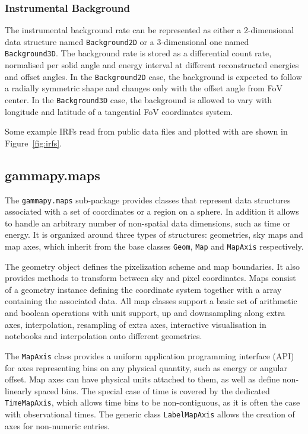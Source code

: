 \documentclass[longauth]{aa}
\newcommand{\code}[1]{\texttt{#1}}
\begin{document}
\subsubsection{Instrumental Background}
The instrumental background rate can be represented as either a 2-dimensional
data structure named \code{Background2D} or a 3-dimensional one named \code{Background3D}.
The background rate is stored as a differential count rate, normalised per solid angle
and energy interval at different reconstructed energies and offset angles.
In the \code{Background2D} case, the background is expected to follow a radially symmetric shape
and changes only with the offset angle from FoV center.
In the \code{Background3D} case, the background is allowed to vary with 
longitude and latitude of a tangential FoV coordinates system.

Some example IRFs read from public data files and plotted with \gammapy are shown 
in Figure~\ref{fig:irfs}.

\subsection{gammapy.maps}
\label{ssec:gammapy-maps}
The \code{gammapy.maps} sub-package provides classes that represent data
structures associated with a set of coordinates or a region on a sphere. In
addition it allows to handle an arbitrary number of non-spatial data
dimensions, such as time or energy. It is organized around three types of
structures: geometries, sky maps and map axes, which inherit from the base
classes \code{Geom}, \code{Map} and \code{MapAxis} respectively.

The geometry object defines the pixelization scheme and map boundaries. It also
provides methods to transform between sky and pixel coordinates. Maps consist
of a geometry instance defining the coordinate system together with a
\numpy array containing the associated data. All map classes support a basic
set of arithmetic and boolean operations with  unit support, up and downsampling
along extra axes, interpolation, resampling of extra axes, interactive visualisation
in notebooks and interpolation onto different geometries.

The \code{MapAxis} class provides a uniform application programming interface
(API) for axes representing
bins on any physical quantity, such as energy or angular offset.
Map axes can have physical units attached to them, as well as define
non-linearly spaced bins. The special case of time is covered by the
dedicated \code{TimeMapAxis}, which allows time bins to be non-contiguous,
as it is often the case with observational times. The generic
class \code{LabelMapAxis} allows the creation of axes for non-numeric entries.
\end{document}
